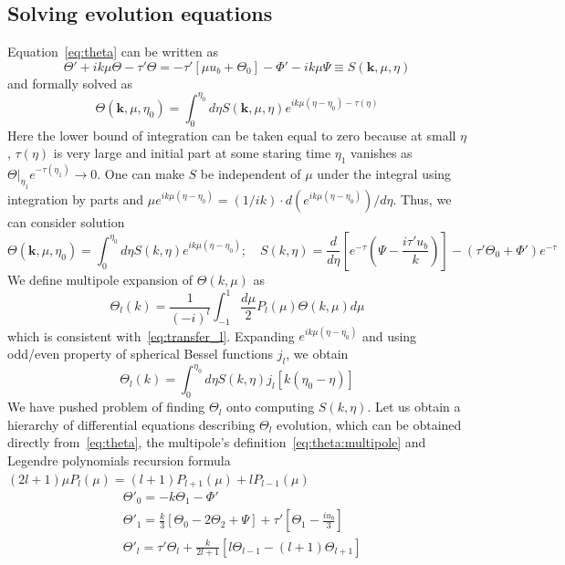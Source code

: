 \documentclass[12pt]{extarticle}
\numberwithin{problem}{section}
\numberwithin{theorem}{section}
\begin{document}
	\subsection{Solving evolution equations}
	Equation~\ref{eq:theta} can be written as
	\begin{equation}
		\Theta' + ik\mu\Theta - \tau'\Theta = -\tau'[\mu u_b + \Theta_0] - \Phi' - ik\mu\Psi \equiv S(\mathbf{k}, \mu, \eta)
	\end{equation}
	and formally solved as
	\begin{equation}
		\Theta(\mathbf{k}, \mu, \eta_0) = \int_0^{\eta_0} d\eta S(\mathbf{k}, \mu, \eta) e^{ik\mu(\eta - \eta_0) - \tau(\eta)}
	\end{equation}
	Here the lower bound of integration can be taken equal to zero because at small $\eta$, $\tau(\eta)$ is very large and initial part at some staring time $\eta_1$ vanishes as $\Theta|_{\eta_1}e^{-\tau(\eta_1)}\to 0$. One can make $S$ be independent of $\mu$ under the integral using integration by parts and $\mu e^{ik\mu(\eta-\eta_0)} = (1/ik)\cdot d(e^{ik\mu(\eta-\eta_0)})/d\eta$. Thus, we can consider solution
	\begin{equation}
		\Theta(\mathbf{k}, \mu, \eta_0) = \int_0^{\eta_0} d\eta S(k, \eta) e^{ik\mu(\eta - \eta_0)};\quad S(k, \eta) = \frac{d}{d\eta}\left[e^{-\tau}\left(\Psi - \frac{i\tau'u_b}{k}\right)\right] - (\tau'\Theta_0 + \Phi')e^{-\tau}
	\end{equation}
	We define multipole expansion of $\Theta(k, \mu)$ as 
	\begin{equation}
		\label{eq:theta:multipole}
		\Theta_l(k) = \frac{1}{(-i)^l}\int^1_{-1}\frac{d\mu}{2}P_l(\mu)\Theta(k, \mu) d\mu
	\end{equation}
	which is consistent with~\ref{eq:transfer_l}. Expanding $e^{ik\mu(\eta - \eta_0)}$ and using odd/even property of spherical Bessel functions $j_l$, we obtain
	\begin{equation}
		\Theta_l(k) = \int_0^{\eta_0}d\eta S(k, \eta) j_l[k(\eta_0 - \eta)]
	\end{equation}
	We have pushed problem of finding $\Theta_l$ onto computing $S(k, \eta)$. Let us obtain a hierarchy of differential equations describing $\Theta_l$ evolution, which can be obtained directly from~\ref{eq:theta}, the multipole's definition~\ref{eq:theta:multipole} and Legendre polynomials recursion formula $(2l + 1)\mu P_l(\mu) = (l + 1)P_{l + 1}(\mu) + lP_{l - 1}(\mu)$
	\begin{align}
		\label{eq:theta:0}
		& \Theta'_0 = -k\Theta_1 - \Phi'\\
		\label{eq:theta:1}
		& \Theta'_1 = \frac{k}{3}\left[\Theta_0 - 2\Theta_2 + \Psi\right] + \tau'\left[\Theta_1 - \frac{iu_b}{3}\right] \\
		\label{eq:theta:high_l}
		& \Theta'_l = \tau'\Theta_l + \frac{k}{2l + 1}\left[l\Theta_{l - 1} - (l + 1)\Theta_{l + 1}\right]
	\end{align}
	
\end{document}
